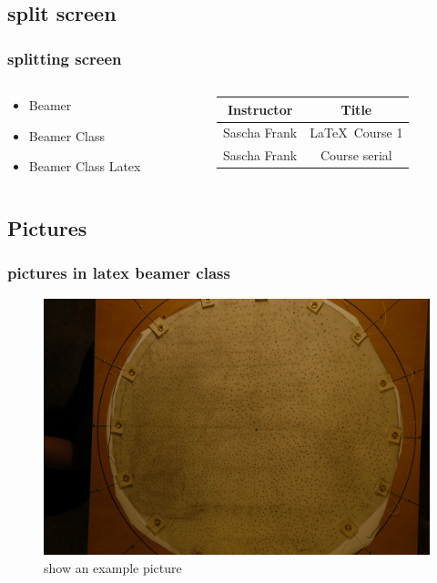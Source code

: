 \documentclass{beamer}
\begin{document}
\subsection{split screen}

\begin{frame}\frametitle{splitting screen}
\begin{columns}
\begin{column}{5cm}
\begin{itemize}
\item Beamer 
\item Beamer Class 
\item Beamer Class Latex 
\end{itemize}
\end{column}
\begin{column}{5cm}
\begin{tabular}{|c|c|}
\hline
\textbf{Instructor} & \textbf{Title} \\
\hline
Sascha Frank &  \LaTeX \ Course 1 \\
\hline
Sascha Frank &  Course serial  \\
\hline
\end{tabular}
\end{column}
\end{columns}
\end{frame}

\subsection{Pictures} 
\begin{frame}\frametitle{pictures in latex beamer class}
\begin{figure}
\includegraphics[scale=0.05]{PIC1.jpg} 
\caption{show an example picture}
\end{figure}
\end{frame}
\end{document}
